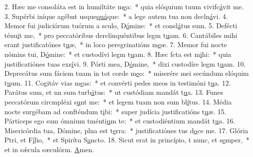 2. Hæc me consoláta est in humiltáte m\uline{e}a:~* quia elóquium tuum vivifc\uline{á}vit me.
3. Supérbi iníque agébnt usque\uline{quá}que:~* a lege autem tua non decln\uline{á}vi.
4. Memor fui judiciórum tuórum a sculo, D\uline{ó}mine:~* et consl\uline{á}tus sum.
5. Defécti ténu\uline{i}t me,~* pro peccatóribus derelinquéntibus legm t\uline{u}am.
6. Cantábiles mihi erant justificatónes t\uline{u}æ,~* in loco peregrinatións m\uline{e}æ.
7. Memor fui nocte nómins tui, D\uline{ó}mine:~* et custodívi legm t\uline{u}am.
8. Hæc fcta est m\uline{i}hi:~* quia justificatiónes tuas exs\uline{í}vi.
9. Pórti mea, D\uline{ó}mine,~* dixi custodíre legm t\uline{u}am.
10. Deprecátus sum fáciem tuam in tot corde m\uline{e}o:~* miserére mei secúndum elóquim t\uline{u}um.
11. Cogitáv vias m\uline{e}as:~* et convérti pedes meos in testimóni t\uline{u}a.
12. Parátus sum, et nn sum turb\uline{á}tus:~* ut custódiam mandát t\uline{u}a.
13. Funes peccatórum circmpléxi s\uline{u}nt me:~* et legem tuam non sum bl\uline{í}tus.
14. Média nocte surgébam ad confténdum t\uline{i}bi:~* super judícia justificatións t\uline{u}æ.
15. Párticeps ego sum ómnium tménti\uline{u}m te:~* et custodiéntium mandát t\uline{u}a.
16. Misericórdia tua, Dómine, plna est t\uline{e}rra:~* justificatiónes tus d\uline{o}ce me.
17. Glória Ptri, et F\uline{í}lio,~* et Spirítu S\uline{a}ncto.
18. Sicut erat in princípio, t nunc, et s\uline{e}mper,~* et in sǽcula sæculórm. \uline{A}men.
